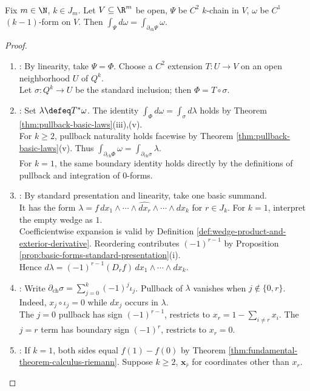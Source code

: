\begin{theorem} \label{thm:stokes-theorem-differential-forms} \\
Fix $m\in\N$, $k\in J_m$. Let $V\subseteq\R^m$ be open, $\Psi$ be $C^2$ $k$-chain in $V$, $\omega$ be $C^1$ $(k-1)$-form on $V$. Then $\int_{\Psi}d\omega=\int_{\partial_{\mathrm{ch}}\Psi}\omega$.
\begin{proof}
\begin{enumerate}[label=(\roman*)]
\setlength{\itemsep}{0pt}
\item {}: By linearity, take $\Psi=\Phi$. Choose a $C^2$ extension $T:U\to V$ on an open neighborhood $U$ of $Q^k$.\\
Let $\sigma:Q^k\to U$ be the standard inclusion; then $\Phi=T\circ\sigma$.
\item {}: Set $\lambda\defeq T^\ast\omega$. The identity $\int_{\Phi}d\omega=\int_{\sigma}d\lambda$ holds by Theorem \ref{thm:pullback-basic-laws}(iii),(v).\\
For $k\geq2$, pullback naturality holds facewise by Theorem \ref{thm:pullback-basic-laws}(v). Thus $\int_{\partial_{\mathrm{ch}}\Phi}\omega=\int_{\partial_{\mathrm{ch}}\sigma}\lambda$.\\
For $k=1$, the same boundary identity holds directly by the definitions of pullback and integration of $0$-forms.
\item {}: By standard presentation and linearity, take one basic summand.\\
It has the form $\lambda=f\,dx_1\wedge\cdots\wedge\widehat{dx_r}\wedge\cdots\wedge dx_k$ for $r\in J_k$. For $k=1$, interpret the empty wedge as $1$.\\
Coefficientwise expansion is valid by Definition \ref{def:wedge-product-and-exterior-derivative}. Reordering contributes $(-1)^{r-1}$ by Proposition \ref{prop:basic-forms-standard-presentation}(i).\\
Hence $d\lambda=(-1)^{r-1}(D_rf)\,dx_1\wedge\cdots\wedge dx_k$.
\item {}: Write $\partial_{\mathrm{ch}}\sigma=\sum\limits_{j=0}^{k}(-1)^j\iota_j$. Pullback of $\lambda$ vanishes when $j\notin\{0,r\}$. Indeed, $x_j\circ\iota_j=0$ while $dx_j$ occurs in $\lambda$.\\
The $j=0$ pullback has sign $(-1)^{r-1}$, restricts to $x_r=1-\sum\limits_{i\neq r}x_i$. The $j=r$ term has boundary sign $(-1)^r$, restricts to $x_r=0$.
\item {}: If $k=1$, both sides equal $f(1)-f(0)$ by Theorem \ref{thm:fundamental-theorem-calculus-riemann}. Suppose $k\geq2$, $\mathbf{x}_{\widehat r}$ for coordinates other than $x_r$.\\

\end{enumerate}
\end{proof}
\end{theorem}
